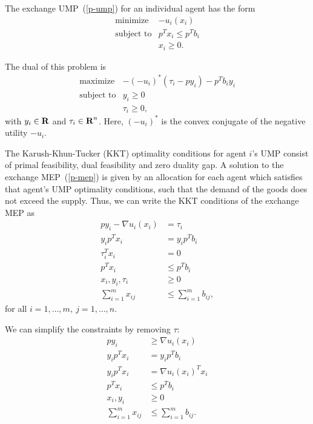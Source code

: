 \documentclass[12pt]{article}
\begin{document}
The exchange UMP~(\ref{p-ump}) for an individual agent has the form
\[
\begin{array}{ll}
\mbox{minimize} & - u_i(x_i)\\
\mbox{subject to} & p^T x_i \leq p^T b_i\\
& x_i \geq 0.
\end{array}
\]

The dual of this problem is
\[
\begin{array}{ll}
\mbox{maximize} & -(- u_i)^*(\tau_i - p y_i) - p^T b_i y_i\\
\mbox{subject to} & y_i \geq 0\\
& \tau_i \geq 0,
\end{array}
\]
with $y_i \in {\mbox{\bf R}}$ and $\tau_i \in {\mbox{\bf R}}^n$. Here, $(- u_i)^*$
is the convex conjugate of the negative utility $-u_i$.

The Karush-Khun-Tucker (KKT) optimality conditions for agent $i$'s UMP consist
of primal feasibility, dual feasibility and zero duality gap. A solution to the
exchange MEP~(\ref{p-mep}) is given by an allocation for each agent which
satisfies that agent's UMP optimality conditions, such that the demand of the
goods does not exceed the supply. Thus, we can write the KKT conditions of the
exchange MEP as
\begin{equation}
\begin{aligned}
p y_i - \nabla u_i(x_i)&= \tau_i\\
y_i p^T x_i &= y_i p^T b_i\\
\tau_i^T x_i &= 0\\
p^T x_i &\leq p^T b_i\\
x_i, y_i, \tau_i &\geq 0\\
\sum_{i=1}^m x_{ij} &\leq \sum_{i=1}^m b_{ij},
\end{aligned}
\label{e-mep-opt1}
\end{equation}
for all $i=1,\ldots,m,\ j=1,\ldots,n$.

We can simplify the constraints by removing $\tau$:
\begin{equation}
\begin{aligned}
p y_i &\geq \nabla u_i(x_i) \\
y_i p^T x_i &= y_i p^T b_i \\
y_i p^T x_i &= \nabla u_i(x_i)^T x_i\\
p^T x_i &\leq p^T b_i\\
x_i, y_i &\geq 0\\
\sum_{i=1}^m x_{ij} &\leq \sum_{i=1}^m b_{ij}.
\end{aligned}
\label{e-mep-opt2}
\end{equation}
\end{document}

